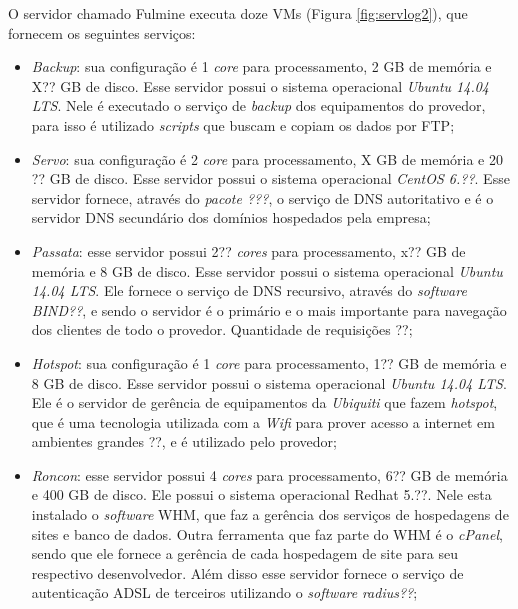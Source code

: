O servidor chamado Fulmine executa doze \ac{VM}s (Figura \ref{fig:servlog2}), que fornecem os seguintes serviços:
\begin{itemize}
 \item \textit{Backup}: sua configuração é 1 \textit{core} para processamento, 2 GB de memória e X?? GB de disco. Esse servidor possui o 
 sistema operacional \textit{Ubuntu 14.04 \ac{LTS}}. Nele é executado o serviço de \textit{backup} dos equipamentos do provedor, para isso 
 é utilizado \textit{scripts} que buscam e copiam os dados por \ac{FTP};
 
 \item \textit{Servo}: sua configuração é 2 \textit{core} para processamento, X GB de memória e 20 ?? GB de disco. Esse servidor possui o 
 sistema operacional \textit{CentOS 6.??}. Esse servidor fornece, através do \textit{pacote ???}, o serviço de \ac{DNS} autoritativo e é o 
 servidor \ac{DNS} secundário dos domínios hospedados pela empresa;
 
 \item \textit{Passata}: esse servidor possui 2?? \textit{cores} para processamento, x?? GB de memória e 8 GB de disco. Esse servidor possui o 
 sistema operacional \textit{Ubuntu 14.04 \ac{LTS}}. Ele fornece o serviço de \ac{DNS} recursivo, através do \textit{software} \textit{BIND??}, 
 e sendo o servidor é o primário e o mais importante para navegação dos clientes de todo o provedor. Quantidade de requisições ??;
 
 \item \textit{Hotspot}: sua configuração é 1 \textit{core} para processamento, 1?? GB de memória e 8 GB de disco. Esse servidor possui o 
 sistema operacional \textit{Ubuntu 14.04 \ac{LTS}}. Ele é o servidor de gerência de equipamentos da \textit{Ubiquiti} que fazem \textit{hotspot}, 
 que é uma tecnologia utilizada com a \textit{Wifi} para prover acesso a internet em ambientes grandes ??, e é utilizado pelo provedor;
 
 \item \textit{Roncon}: esse servidor possui 4 \textit{cores} para processamento, 6?? GB de memória e 400 GB de disco. Ele possui o sistema
 operacional Redhat 5.??. Nele esta instalado o \textit{software} \ac{WHM}, que faz a gerência dos serviços de hospedagens de sites e banco de 
 dados. Outra ferramenta que faz parte do \ac{WHM} é o \textit{cPanel}, sendo que ele fornece a gerência de cada hospedagem de site para seu 
 respectivo desenvolvedor.
 Além disso esse servidor fornece o serviço de autenticação \ac{ADSL} de terceiros utilizando o \textit{software} \textit{radius??};
 

\end{itemize}
